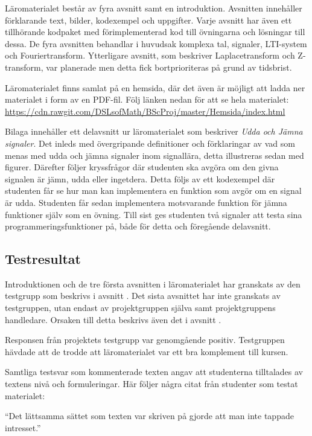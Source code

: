 \documentclass[12pt,a4paper,twoside,openright]{article}
\begin{document}
Läromaterialet består av fyra avsnitt samt en introduktion. Avsnitten
innehåller förklarande text, bilder, kodexempel och uppgifter. Varje
avsnitt har även ett tillhörande kodpaket med förimplementerad kod
till övningarna och lösningar till dessa. De fyra avsnitten behandlar
i huvudsak komplexa tal, signaler, LTI-system och Fouriertransform.
Ytterligare avsnitt, som beskriver Laplacetransform och Z-transform,
var planerade men detta fick bortprioriteras på grund av tidsbrist.

Läromaterialet finns samlat på en hemsida, där det även är möjligt att
ladda ner materialet i form av en PDF-fil. Följ länken nedan för att
se hela materialet:
\url{https://cdn.rawgit.com/DSLsofMath/BScProj/master/Hemsida/index.html}

Bilaga  innehåller ett delavsnitt ur läromaterialet som
beskriver \textit{Udda och Jämna signaler}. Det inleds med
övergripande definitioner och förklaringar av vad som menas med udda
och jämna signaler inom signallära, detta illustreras sedan med
figurer. Därefter följer kryssfrågor där studenten ska avgöra om den
givna signalen är jämn, udda eller ingetdera. Detta följs av ett
kodexempel där studenten får se hur man kan implementera en funktion
som avgör om en signal är udda. Studenten får sedan implementera
motsvarande funktion för jämna funktioner själv som en övning. Till
sist ges studenten två signaler att testa sina
programmeringsfunktioner på, både för detta och föregående delavsnitt.


\subsection{Testresultat}
\label{sec:testResultat}
Introduktionen och de tre första avsnitten i läromaterialet har
granskats av den testgrupp som beskrivs i avsnitt
. Det sista avsnittet har inte granskats av
testgruppen, utan endast av projektgruppen själva samt projektgruppens
handledare. Orsaken till detta beskrivs även det i avsnitt
.

Responsen från projektets testgrupp var genomgående
positiv. Testgruppen hävdade att de trodde att läromaterialet var ett
bra komplement till kursen.

Samtliga testsvar som kommenterade texten angav att studenterna
tilltalades av textens nivå och formuleringar. Här följer några citat
från studenter som testat materialet:
\begin{displayquote}
  ``Det lättsamma sättet som texten var skriven på gjorde att man
  inte tappade intresset.''
\end{displayquote}
\end{document}
